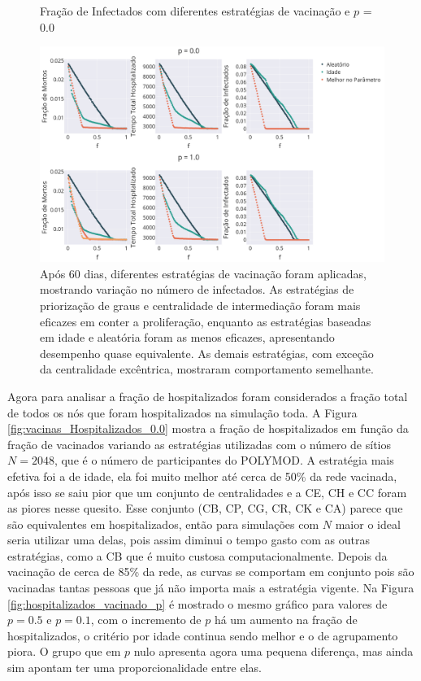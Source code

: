 \begin{figure}[H]
    \centering
    \captionsetup{font=normalsize,skip=0.8pt,singlelinecheck=on,labelsep=endash}
    \caption{Fração de Infectados com diferentes estratégias de vacinação e $p$ = 0.0}
    \includegraphics[scale= 0.45]{figuras/cmpara_p_f_ponderado.png}
    \captionsetup{font=small,justification=justified}
    
    \caption*{ Após 60 dias, diferentes estratégias de vacinação foram aplicadas, mostrando variação no número de infectados. As estratégias de priorização de graus e centralidade de intermediação foram mais eficazes em conter a proliferação, enquanto as estratégias baseadas em idade e aleatória foram as menos eficazes, apresentando desempenho quase equivalente. As demais estratégias, com exceção da centralidade excêntrica, mostraram comportamento semelhante.}
    \label{fig:resultados_metricas_ponderado}
\end{figure}

Agora para analisar a fração de hospitalizados foram considerados a fração total de todos os nós que foram hospitalizados na simulação toda. A Figura \ref{fig:vacinas_Hospitalizados_0.0} mostra a fração de hospitalizados em função da fração de vacinados variando as estratégias utilizadas com o número de sítios $N = 2048$, que é o número de participantes do POLYMOD. 
A estratégia mais efetiva foi a de idade, ela foi muito melhor até cerca de %
50\% da rede vacinada, após isso se saiu pior que um conjunto de centralidades e a CE, CH e CC foram as piores nesse quesito. Esse conjunto (CB, CP, CG, CR, CK e CA) parece que são equivalentes em hospitalizados, então para simulações com $N$ maior o ideal seria utilizar uma delas, pois assim diminui o tempo gasto com as outras estratégias, como a CB que é muito custosa computacionalmente. Depois da vacinação de cerca de 85\% da rede, as curvas se comportam em conjunto pois são vacinadas tantas pessoas que já não importa mais a estratégia vigente. Na Figura \ref{fig:hospitalizados_vacinado_p} é mostrado o mesmo gráfico para valores de $p = 0.5$ e $p = 0.1$, com o incremento de $p$ há um aumento na fração de hospitalizados, o critério por idade continua sendo melhor e o de agrupamento piora. O grupo que em $p$ nulo apresenta agora uma pequena diferença, mas ainda sim apontam ter uma proporcionalidade entre elas.

